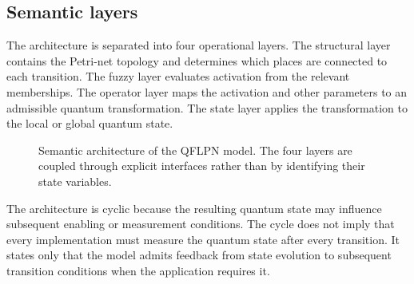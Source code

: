 \documentclass[final,3p,times]{elsarticle}
\begin{document}
\subsection{Semantic layers}

The architecture is separated into four operational layers. The structural layer contains the Petri-net topology and determines which places are connected to each transition. The fuzzy layer evaluates activation from the relevant memberships. The operator layer maps the activation and other parameters to an admissible quantum transformation. The state layer applies the transformation to the local or global quantum state.

\begin{figure}[tbp]
    \centering
{}
    \caption{Semantic architecture of the QFLPN model. The four layers are coupled through explicit interfaces rather than by identifying their state variables.}
    \label{fig:qflpn-architecture}
\end{figure}

The architecture is cyclic because the resulting quantum state may influence subsequent enabling or measurement conditions. The cycle does not imply that every implementation must measure the quantum state after every transition. It states only that the model admits feedback from state evolution to subsequent transition conditions when the application requires it.
\end{document}
